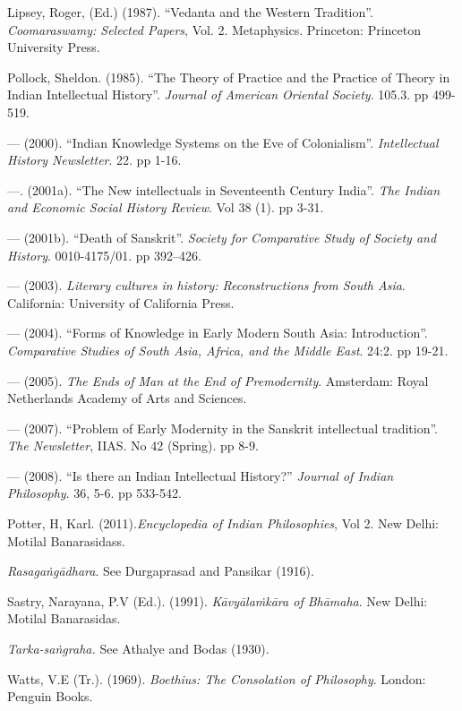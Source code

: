 \begin{thebibliography}{99}
 Lipsey, Roger, (Ed.) (1987). “Vedanta and the Western Tradition”. {\sl Coomaraswamy: Selected Papers}, Vol. 2. Metaphysics. Princeton: Princeton University Press. 

 Pollock, Sheldon. (1985). “The Theory of Practice and the Practice of Theory in Indian Intellectual History”. {\sl Journal of American Oriental Society}. 105.3. pp 499-519. 

 --- (2000). “Indian Knowledge Systems on the Eve of Colonialism”. {\sl Intellectual History Newsletter}. 22. pp 1-16.

 ---. (2001a). “The New intellectuals in Seventeenth Century India”. {\sl The Indian and Economic Social History Review}. Vol 38 (1). pp 3-31.

 --- (2001b). “Death of Sanskrit”. {\sl Society for Comparative Study of Society and History}. 0010-4175/01. pp 392–426. 

 --- (2003). {\sl Literary cultures in history: Reconstructions from South Asia}. California: University of California Press. 

 --- (2004). “Forms of Knowledge in Early Modern South Asia: Introduction”. {\sl Comparative Studies of South Asia, Africa, and the Middle East}. 24:2. pp 19-21.

 --- (2005). {\sl The Ends of Man at the End of Premodernity}. Amsterdam: Royal Netherlands Academy of Arts and Sciences. 

 --- (2007). “Problem of Early Modernity in the Sanskrit intellectual tradition”. {\sl The Newsletter}, IIAS. No 42 (Spring). pp 8-9. 

 --- (2008). “Is there an Indian Intellectual History?” {\sl Journal of Indian Philosophy}. 36, 5-6. pp 533-542.

 Potter, H, Karl. (2011).{\sl  Encyclopedia of Indian Philosophies}, Vol 2. New Delhi: Motilal Banarasidass. 

{\em Rasagaṅgādhara}. See Durgaprasad and Pansikar (1916).

 Sastry, Narayana, P.V (Ed.). (1991). {\sl Kāvyālaṁkāra of Bhāmaha}. New Delhi: Motilal Banarasidas. 

 {\sl Tarka-saṅgraha.} See Athalye and Bodas (1930).

 Watts, V.E (Tr.). (1969). {\sl Boethius: The Consolation of Philosophy}. London: Penguin Books. 
\end{thebibliography}

\theendnotes
\label{chapter7\thechapter:end}
